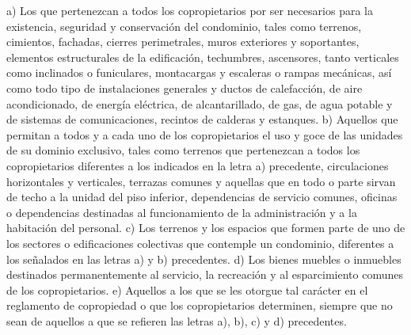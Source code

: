     a) Los que pertenezcan a todos los copropietarios por ser necesarios para la existencia, seguridad y conservación del condominio, tales como terrenos, cimientos, fachadas, cierres perimetrales, muros exteriores y soportantes, elementos estructurales de la edificación, techumbres, ascensores, tanto verticales como inclinados o funiculares, montacargas y escaleras o rampas mecánicas, así como todo tipo de instalaciones generales y ductos de calefacción, de aire acondicionado, de energía eléctrica, de alcantarillado, de gas, de agua potable y de sistemas de comunicaciones, recintos de calderas y estanques.
    b) Aquellos que permitan a todos y a cada uno de los copropietarios el uso y goce de las unidades de su dominio exclusivo, tales como terrenos que pertenezcan a todos los copropietarios diferentes a los indicados en la letra a) precedente, circulaciones horizontales y verticales, terrazas comunes y aquellas que en todo o parte sirvan de techo a la unidad del piso inferior, dependencias de servicio comunes, oficinas o dependencias destinadas al funcionamiento de la administración y a la habitación del personal.
    c) Los terrenos y los espacios que formen parte de uno de los sectores o edificaciones colectivas que contemple un condominio, diferentes a los señalados en las letras a) y b) precedentes.
    d) Los bienes muebles o inmuebles destinados permanentemente al servicio, la recreación y al esparcimiento comunes de los copropietarios.
    e) Aquellos a los que se les otorgue tal carácter en el reglamento de copropiedad o que los copropietarios determinen, siempre que no sean de aquellos a que se refieren las letras a), b), c) y d) precedentes.
     
